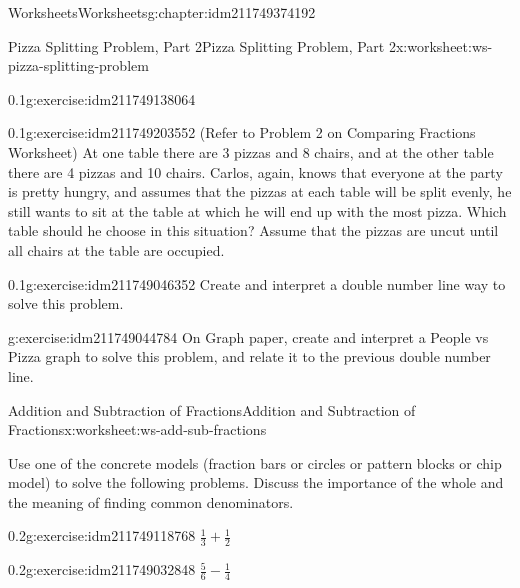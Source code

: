 \documentclass[twoside,11pt,]{book}
\begin{document}
\begin{chapterptx}{Worksheets}{}{Worksheets}{}{}{g:chapter:idm211749374192}
\begin{worksheet-section-numberless}{Pizza Splitting Problem, Part 2}{}{Pizza Splitting Problem, Part 2}{}{}{x:worksheet:ws-pizza-splitting-problem}
\begin{divisionexercise}{3}{}{0.1}{g:exercise:idm211749138064}
\begin{sidebyside}{1}{0.05}{0.05}{0}
\begin{sbspanel}{0.9}
\end{sbspanel}%
\end{sidebyside}%
\end{divisionexercise}%
\begin{divisionexercise}{4}{}{0.1}{g:exercise:idm211749203552}%
(Refer to Problem 2 on Comparing Fractions Worksheet) At one table there are 3 pizzas and 8 chairs, and at the other table there are 4 pizzas and 10 chairs.  Carlos, again, knows that everyone at the party is pretty hungry, and assumes that the pizzas at each table will be split evenly, he still wants to sit at the table at which he will end up with the most pizza.  Which table should he choose in this situation? Assume that the pizzas are uncut until all chairs at the table are occupied.%
\end{divisionexercise}%
\begin{divisionexercise}{5}{}{0.1}{g:exercise:idm211749046352}%
Create and interpret a double number line way to solve this problem.%
\end{divisionexercise}%
\begin{divisionexercise}{6}{}{}{g:exercise:idm211749044784}%
On Graph paper, create and interpret a People vs Pizza graph to solve this problem, and relate it to the previous double number line.%
\end{divisionexercise}%
\end{worksheet-section-numberless}
\restoregeometry
%
%
\typeout{************************************************}
\typeout{************************************************}
%
\begin{worksheet-section-numberless}{Addition and Subtraction of Fractions}{}{Addition and Subtraction of Fractions}{}{}{x:worksheet:ws-add-sub-fractions}
\begin{introduction}{}%
Use one of the concrete models (fraction bars or circles or pattern blocks or chip model) to solve the following problems. Discuss the importance of the whole and the meaning of finding common denominators.%
\end{introduction}%
\begin{divisionexercise}{1}{}{0.2}{g:exercise:idm211749118768}%
\(\frac{1}{3} + \frac{1}{2} \)%
\end{divisionexercise}%
\begin{divisionexercise}{2}{}{0.2}{g:exercise:idm211749032848}%
\(\frac{5}{6} - \frac{1}{4} \)%
\end{divisionexercise}%

\end{worksheet-section-numberless}
\end{chapterptx}
\end{document}
